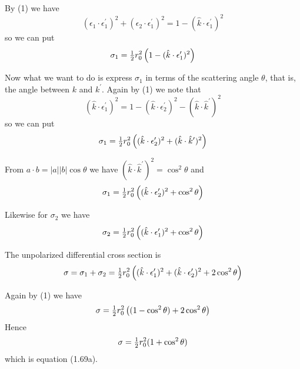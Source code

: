 \documentclass[12pt]{article}
\begin{document}
By (1) we have
\begin{equation*}
(\epsilon_1\cdot\epsilon_1^\prime)^2
+(\epsilon_2\cdot\epsilon_1^\prime)^2=1-(\hat k\cdot\epsilon_1^\prime)^2
\end{equation*}
so we can put
\begin{equation*}
\sigma_1=\hbox{$1\over2$}r_0^2\left(1-(\hat k\cdot\epsilon_1^\prime)^2\right)
\end{equation*}

Now what we want to do is express $\sigma_1$ in terms of the scattering angle
$\theta$, that is, the angle between $k$ and $k^\prime$.
Again by (1) we note that
\begin{equation*}
(\hat k\cdot\epsilon_1^\prime)^2=1-(\hat k\cdot\epsilon_2^\prime)^2
-(\hat k\cdot\hat k^\prime)^2
\end{equation*}
so we can put
\begin{equation*}
\sigma_1=\hbox{$1\over2$}r_0^2\left((\hat k\cdot\epsilon_2^\prime)^2
+(\hat k\cdot\hat k^\prime)^2\right)
\end{equation*}

From $a\cdot b=|a||b|\cos\theta$ we have $(\hat k\cdot\hat k^\prime)^2
=\cos^2\theta$ and
\begin{equation*}
\sigma_1=\hbox{$1\over2$}r_0^2\left((\hat k\cdot\epsilon_2^\prime)^2
+\cos^2\theta\right)
\end{equation*}

Likewise for $\sigma_2$ we have
\begin{equation*}
\sigma_2=\hbox{$1\over2$}r_0^2\left((\hat k\cdot\epsilon_1^\prime)^2+\cos^2\theta\right)
\end{equation*}

The unpolarized differential cross section is
\begin{equation*}
\sigma=\sigma_1+\sigma_2
=\hbox{$1\over2$}r_0^2\left((\hat k\cdot\epsilon_1^\prime)^2
+(\hat k\cdot\epsilon_2^\prime)^2+2\cos^2\theta\right)
\end{equation*}

Again by (1) we have
\begin{equation*}
\sigma=\hbox{$1\over2$}r_0^2\left((1-\cos^2\theta)+2\cos^2\theta\right)
\end{equation*}
Hence
\begin{equation*}
\sigma=\hbox{$1\over2$}r_0^2(1+\cos^2\theta)
\end{equation*}
which is equation (1.69a).
\end{document}
